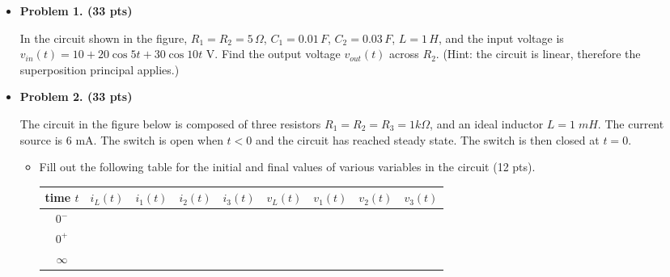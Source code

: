 \begin{itemize}

\item {\bf Problem 1. (33 pts)}

In the circuit shown in the figure, $R_1=R_2=5\,\Omega$, $C_1=0.01\,F$,
$C_2=0.03\,F$, $L=1\,H$, and the input voltage is 
$v_{in}(t)=10+20\cos 5 t+30 \cos 10 t$ V. Find the output voltage $v_{out}(t)$
across $R_2$. (Hint: the circuit is linear, therefore the superposition
principal applies.)



\item {\bf Problem 2. (33 pts)}

The circuit in the figure below is composed of three resistors
$R_1=R_2=R_3=1k\Omega$, and an ideal inductor $L=1\;mH$. The current source 
is 6 mA. The switch is open when $t<0$ and the circuit has reached steady
state. The switch is then closed at $t=0$. 


\begin{itemize}

\item Fill out the following table for the initial and final values of various
variables in the circuit (12 pts).

\begin{tabular}{c||cccc|cccc} \hline
  time $t$&$i_L(t)$&$i_1(t)$&$i_2(t)$&$i_3(t)$&$v_L(t)$&$v_1(t)$&$v_2(t)$&$v_3(t)$\\ \hline \hline
  $0^-$    & & & & & & & & \\ \hline
  $0^+$    & & & & & & & & \\ \hline
  $\infty$ & & & & & & & & \\ \hline
\end{tabular}


\end{itemize}
\end{itemize}
